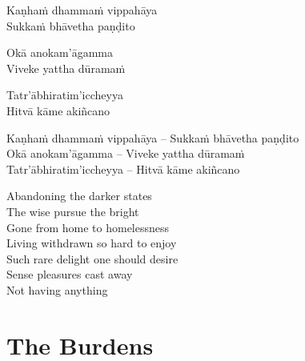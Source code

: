 \ifninebythirteen

\begin{pali-hang-verses}
  Kaṇhaṁ dhammaṁ vippahāya\\
  Sukkaṁ bhāvetha paṇḍito
\end{pali-hang-verses}
\begin{pali-hang-together}
  Okā anokam'āgamma\\
  Viveke yattha dūramaṁ
\end{pali-hang-together}
\begin{pali-hang-together}
  Tatr'ābhiratim'iccheyya\\
  Hitvā kāme akiñcano
\end{pali-hang-together}

\else

\begin{verses}
  Kaṇhaṁ dhammaṁ vippahāya – Sukkaṁ bhāvetha paṇḍito\\
  Okā anokam'āgamma – Viveke yattha dūramaṁ\\
  Tatr'ābhiratim'iccheyya – Hitvā kāme akiñcano
\end{verses}

\fi

\begin{english-verses}
  Abandoning the darker states\\
  The wise pursue the bright\\
  Gone from home to homelessness\ifdigital\makeatletter\hyperlink{endnote37-appendix}\makeatother\fi\\
  Living withdrawn so hard to enjoy\ifdigital\makeatletter\hyperlink{endnote38-appendix}\makeatother\fi\\
  Such rare delight one should desire\\
  Sense pleasures cast away\\
  Not having anything
\end{english-verses}

\suttaRef{[Dhp 85-88]}

\ifdigital{}\fi



\section{The Burdens}
\label{burdens}

